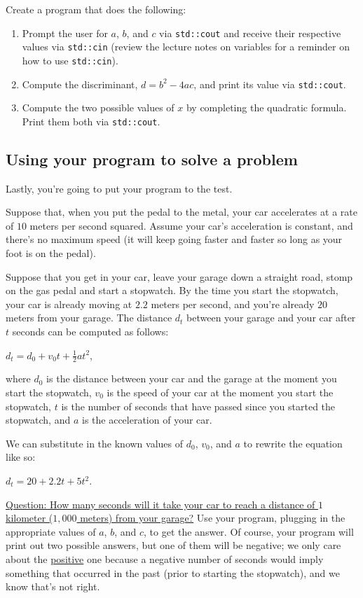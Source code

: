\documentclass{article}
\begin{document}
Create a program that does the following:

\begin{enumerate}
    \item Prompt the user for $a$, $b$, and $c$ via \texttt{std::cout} and receive their respective values via \texttt{std::cin} (review the lecture notes on variables for a reminder on how to use \texttt{std::cin}).
    \item Compute the discriminant, $d = b^2 - 4ac$, and print its value via \texttt{std::cout}.
    \item Compute the two possible values of $x$ by completing the quadratic formula. Print them both via \texttt{std::cout}.
\end{enumerate}

\subsection{Using your program to solve a problem}

Lastly, you're going to put your program to the test.

Suppose that, when you put the pedal to the metal, your car accelerates at a rate of $10$ meters per second squared. Assume your car's acceleration is constant, and there's no maximum speed (it will keep going faster and faster so long as your foot is on the pedal).

Suppose that you get in your car, leave your garage down a straight road, stomp on the gas pedal and start a stopwatch. By the time you start the stopwatch, your car is already moving at $2.2$ meters per second, and you're already $20$ meters from your garage. The distance $d_t$ between your garage and your car after $t$ seconds can be computed as follows:

$d_t = d_0 + v_0t + \frac{1}{2}at^2$,

where $d_0$ is the distance between your car and the garage at the moment you start the stopwatch, $v_0$ is the speed of your car at the moment you start the stopwatch, $t$ is the number of seconds that have passed since you started the stopwatch, and $a$ is the acceleration of your car.

We can substitute in the known values of $d_0$, $v_0$, and $a$ to rewrite the equation like so:

$d_t = 20 + 2.2t + 5t^2$.

\ul{Question: How many seconds will it take your car to reach a distance of $1$ kilometer ($1{,}000$ meters) from your garage?} Use your program, plugging in the appropriate values of $a$, $b$, and $c$, to get the answer. Of course, your program will print out two possible answers, but one of them will be negative; we only care about the \ul{positive} one because a negative number of seconds would imply something that occurred in the past (prior to starting the stopwatch), and we know that's not right.
\end{document}
